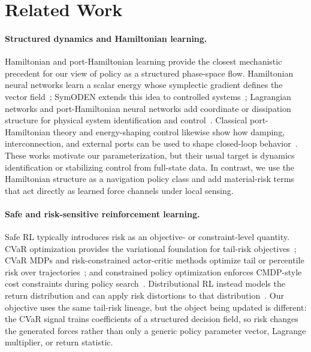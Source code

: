 \section{Related Work}
\label{sec:related}

\paragraph{Structured dynamics and Hamiltonian learning.}
Hamiltonian and port-Hamiltonian learning provide the closest mechanistic
precedent for our view of policy as a structured phase-space flow.
Hamiltonian neural networks learn a scalar energy whose symplectic
gradient defines the vector field~\citep{greydanus2019hamiltonian};
SymODEN extends this idea to controlled systems~\citep{zhong2020symplectic};
Lagrangian networks and port-Hamiltonian neural networks add coordinate
or dissipation structure for physical system identification and
control~\citep{cranmer2020lagrangian,desai2021porthamiltonian}.
Classical port-Hamiltonian theory and energy-shaping control likewise
show how damping, interconnection, and external ports can be used to
shape closed-loop behavior~\citep{vanderschaft2014port}.
These works motivate our parameterization, but their usual target is
dynamics identification or stabilizing control from full-state data.
In contrast, we use the Hamiltonian structure as a navigation policy
class and add material-risk terms that act directly as learned force
channels under local sensing.

\paragraph{Safe and risk-sensitive reinforcement learning.}
Safe RL typically introduces risk as an objective- or constraint-level
quantity. CVaR optimization provides the variational foundation for
tail-risk objectives~\citep{rockafellar2000optimization}; CVaR MDPs and
risk-constrained actor-critic methods optimize tail or percentile risk
over trajectories~\citep{chow2015risk,chow2017risk}; and constrained
policy optimization enforces CMDP-style cost constraints during policy
search~\citep{achiam2017constrained}. Distributional RL instead models
the return distribution and can apply risk distortions to that
distribution~\citep{bellemare2017distributional,dabney2018implicit}.
Our objective uses the same tail-risk lineage, but the object being
updated is different: the CVaR signal trains coefficients of a structured
decision field, so risk changes the generated forces rather than only a
generic policy parameter vector, Lagrange multiplier, or return statistic.

